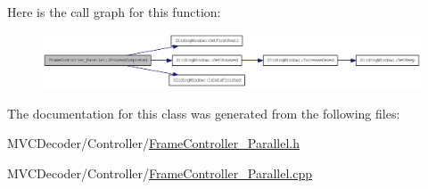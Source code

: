 Here is the call graph for this function:\nopagebreak
\begin{figure}[H]
\begin{center}
\leavevmode
\includegraphics[width=396pt]{class_frame_controller___parallel_ac778eb523c6725a9e4da4e4239a88b2a_cgraph}
\end{center}
\end{figure}




The documentation for this class was generated from the following files:\begin{DoxyCompactItemize}
\item 
MVCDecoder/Controller/\hyperlink{_frame_controller___parallel_8h}{FrameController\_\-Parallel.h}\item 
MVCDecoder/Controller/\hyperlink{_frame_controller___parallel_8cpp}{FrameController\_\-Parallel.cpp}\end{DoxyCompactItemize}

